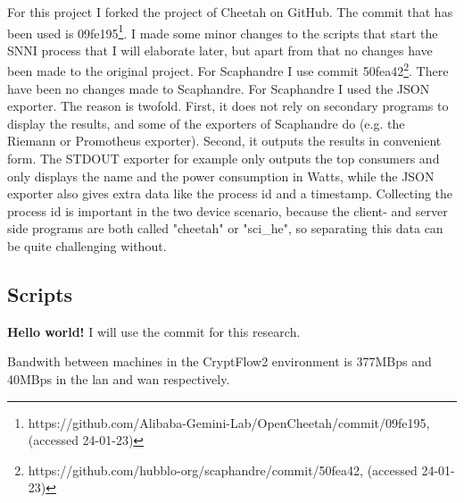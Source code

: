 \documentclass[../thesis.tex]{subfiles}
\begin{document}
For this project I forked the project of Cheetah on GitHub. The commit that has been used is 09fe195\footnote{https://github.com/Alibaba-Gemini-Lab/OpenCheetah/commit/09fe195,  (accessed 24-01-23)}. I made some minor changes to the scripts that start the SNNI process that I will elaborate later, but apart from that no changes have been made to the original project. For Scaphandre I use commit 50fea42\footnote{https://github.com/hubblo-org/scaphandre/commit/50fea42, (accessed 24-01-23)}. There have been no changes made to Scaphandre. For Scaphandre I used the JSON exporter. The reason is twofold. First, it does not rely on secondary programs to display the results, and some of the exporters of Scaphandre do (e.g. the Riemann or Promotheus exporter). Second, it outputs the results in convenient form. The STDOUT exporter for example only outputs the top consumers and only displays the name and the power consumption in Watts, while the JSON exporter also gives extra data like the process id and a timestamp. Collecting the process id is important in the two device scenario, because the client- and server side programs are both called "cheetah" or "sci\_he", so separating this data can be quite challenging without.     

\subsection{Scripts}

\textbf{Hello world!}
I will use the commit  for this research.

Bandwith between machines in the CryptFlow2 environment is 377MBps and 40MBps in the lan and wan respectively. 
\end{document}
